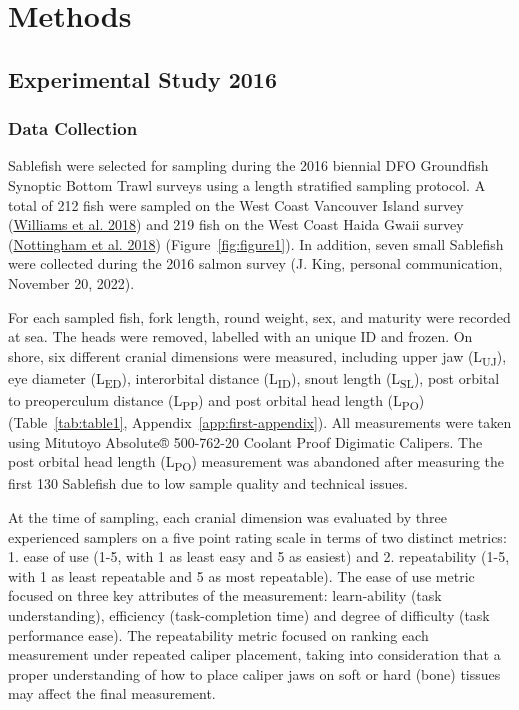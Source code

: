 \documentclass[12pt]{article}\usepackage[]{graphicx}\usepackage[]{color}
\begin{document}
\hypertarget{methods}{%
\section{Methods}\label{methods}}

\hypertarget{experimental-study-2016}{%
\subsection{Experimental Study 2016}\label{experimental-study-2016}}

\hypertarget{data-collection}{%
\subsubsection{Data Collection}\label{data-collection}}

Sablefish were selected for sampling during the 2016 biennial DFO Groundfish Synoptic Bottom Trawl surveys using a length stratified sampling protocol. A total of 212 fish were sampled on the West Coast Vancouver Island survey (\protect\hyperlink{ref-Williams2018}{Williams et al. 2018}) and 219 fish on the West Coast Haida Gwaii survey (\protect\hyperlink{ref-Nottingham2018}{Nottingham et al. 2018}) (Figure~\ref{fig:figure1}). In addition, seven small Sablefish were collected during the 2016 salmon survey (J. King, personal communication, November 20, 2022).

For each sampled fish, fork length, round weight, sex, and maturity were recorded at sea. The heads were removed, labelled with an unique ID and frozen. On shore, six different cranial dimensions were measured, including upper jaw (L\textsubscript{UJ}), eye diameter (L\textsubscript{ED}), interorbital distance (L\textsubscript{ID}), snout length (L\textsubscript{SL}), post orbital to preoperculum distance (L\textsubscript{PP}) and post orbital head length (L\textsubscript{PO}) (Table~\ref{tab:table1}, Appendix~\ref{app:first-appendix}). All measurements were taken using Mitutoyo Absolute® 500-762-20 Coolant Proof Digimatic Calipers. The post orbital head length (L\textsubscript{PO}) measurement was abandoned after measuring the first 130 Sablefish due to low sample quality and technical issues.

At the time of sampling, each cranial dimension was evaluated by three experienced samplers on a five point rating scale in terms of two distinct metrics: 1. ease of use (1-5, with 1 as least easy and 5 as easiest) and 2. repeatability (1-5, with 1 as least repeatable and 5 as most repeatable). The ease of use metric focused on three key attributes of the measurement: learn-ability (task understanding), efficiency (task-completion time) and degree of difficulty (task performance ease). The repeatability metric focused on ranking each measurement under repeated caliper placement, taking into consideration that a proper understanding of how to place caliper jaws on soft or hard (bone) tissues may affect the final measurement.
\end{document}

